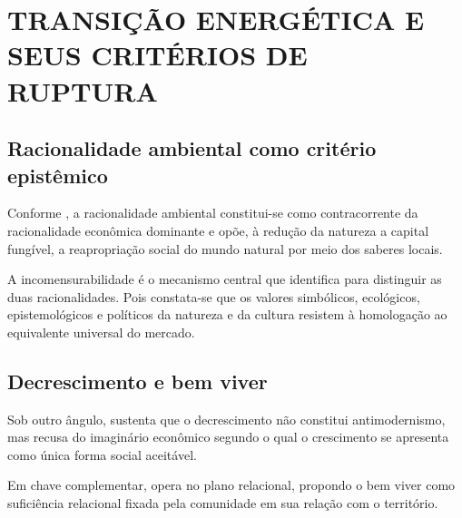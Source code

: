 
\section{\MakeUppercase{Transição energética e seus critérios de ruptura}}

\subsection{Racionalidade ambiental como critério epistêmico}

Conforme , a racionalidade ambiental constitui-se como contracorrente da racionalidade econômica dominante e opõe, à redução da natureza a capital fungível, a reapropriação social do mundo natural por meio dos saberes locais.

A incomensurabilidade é o mecanismo central que  identifica para distinguir as duas racionalidades. Pois constata-se que os valores simbólicos, ecológicos, epistemológicos e políticos da natureza e da cultura resistem à homologação ao equivalente universal do mercado.

\subsection{Decrescimento e bem viver}

Sob outro ângulo,  sustenta que o decrescimento não constitui antimodernismo, mas recusa do imaginário econômico segundo o qual o crescimento se apresenta como única forma social aceitável.

Em chave complementar,  opera no plano relacional, propondo o bem viver como suficiência relacional fixada pela comunidade em sua relação com o território.
